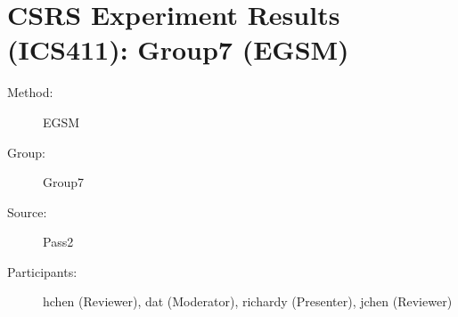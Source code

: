 \chapter {CSRS Experiment Results (ICS411): Group7 (EGSM)}
\small
	  

\begin{description}
\item [Method:] EGSM
\item [Group:] Group7
\item [Source:] Pass2
\item [Participants:] hchen (Reviewer), dat (Moderator), richardy (Presenter), jchen (Reviewer)
\end{description}
